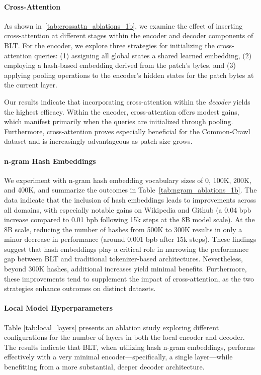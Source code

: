 \paragraph{Cross-Attention} 
As shown in~\autoref{tab:crossattn_ablations_1b}, we examine the effect of inserting cross-attention at different stages within the encoder and decoder components of {\textsc BLT}. For the encoder, we explore three strategies for initializing the cross-attention queries: (1) assigning all global states a shared learned embedding, (2) employing a hash-based embedding derived from the patch's bytes, and (3) applying pooling operations to the encoder's hidden states for the patch bytes at the current layer.

Our results indicate that incorporating cross-attention within the \textit{decoder} yields the highest efficacy. Within the encoder, cross-attention offers modest gains, which manifest primarily when the queries are initialized through pooling. Furthermore, cross-attention proves especially beneficial for the Common-Crawl dataset and is increasingly advantageous as patch size grows.

\paragraph{n-gram Hash Embeddings} 

We experiment with n-gram hash embedding vocabulary sizes of 0, 100K, 200K, and 400K, and summarize the outcomes in Table~\ref{tab:ngram_ablations_1b}. The data indicate that the inclusion of hash embeddings leads to improvements across all domains, with especially notable gains on Wikipedia and Github (a 0.04 bpb increase compared to 0.01 bpb following 15k steps at the 8B model scale). At the 8B scale, reducing the number of hashes from 500K to 300K results in only a minor decrease in performance (around 0.001 bpb after 15k steps). These findings suggest that hash embeddings play a critical role in narrowing the performance gap between {\textsc BLT} and traditional tokenizer-based architectures. Nevertheless, beyond 300K hashes, additional increases yield minimal benefits. Furthermore, these improvements tend to supplement the impact of cross-attention, as the two strategies enhance outcomes on distinct datasets.

\paragraph{Local Model Hyperparameters} Table \ref{tab:local_layers} presents an ablation study exploring different configurations for the number of layers in both the local encoder and decoder. The results indicate that {\textsc BLT}, when utilizing hash n-gram embeddings, performs effectively with a very minimal encoder—specifically, a single layer—while benefitting from a more substantial, deeper decoder architecture.

